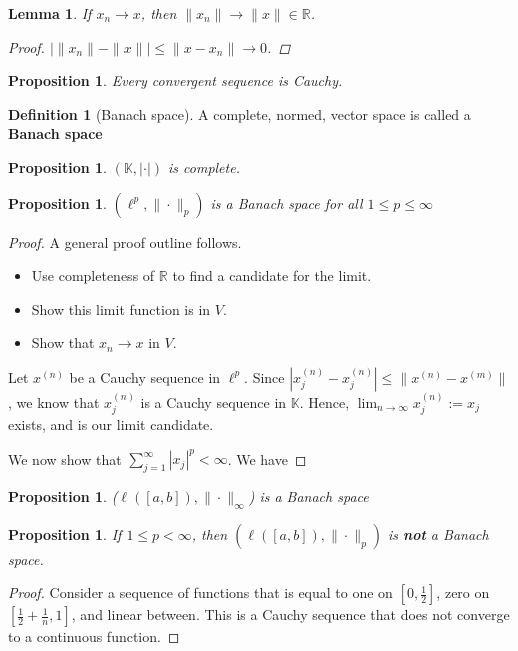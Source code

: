 \documentclass[10pt, reqno, oneside]{amsart}
\theoremstyle{plain}%
\newtheorem{lem}[thm]{Lemma}
\newtheorem{prop}[thm]{Proposition}
\theoremstyle{definition}
\newtheorem{defn}[thm]{Definition}
\theoremstyle{remark}
\newcommand{\R}{\mathbb{R}}
\newcommand{\K}{\mathbb{K}}
\begin{document}
\begin{lem}
	If $x_n \rightarrow x$, then $\| x_n \| \rightarrow \| x \| \in \R$.
	\begin{proof}
		$\left| \| x_n \| - \| x \| \right| \leq \| x - x_n \| \rightarrow 0$.
	\end{proof}
\end{lem}

\begin{prop}
	Every convergent sequence is Cauchy.
\end{prop}

\begin{defn}[Banach space]
A complete, normed, vector space is called a \textbf{Banach space}
\end{defn}

\begin{prop}
	$( \K, |\cdot |)$ is complete.
\end{prop}

\begin{prop}
	$(\ell^p, \| \cdot \|_p)$ is a Banach space for all $1 \leq p \leq \infty$
\end{prop}

\begin{proof}
	A general proof outline follows.
	\begin{itemize}
		\item Use completeness of $\R$ to find a candidate for the limit.
		\item Show this limit function is in $V$.
		\item Show that $x_n \rightarrow x$ in $V$.
 	\end{itemize}
	Let $x^{(n)}$ be a Cauchy sequence in $\ell^p$.  Since $|x_j^{(n)} - x_{j}^{(n)}| \leq \|x^{(n)} - x^{(m)}\|$, we know that $x^{(n)}_j$ is a Cauchy sequence in $\K$.  Hence, $\lim_{n \rightarrow \infty} x^{(n)}_j := x_j$ exists, and is our limit candidate.
	
	We now show that $\sum_{j =1}^\infty |x_j|^p < \infty$.  We have 
\end{proof}

\begin{prop}
	($\ell([a,b]), \|\cdot \|_\infty$) is a Banach space
\end{prop}

\begin{prop}
	If $1 \leq p < \infty$, then $(\ell([a,b]), \| \cdot \|_p)$ is \textbf{not} a Banach space.
\end{prop}
\begin{proof}
	Consider a sequence of functions that is equal to one on $[0, \frac{1}{2}]$, zero on $[\frac{1}{2}+ \frac{1}{n}, 1]$, and linear between.  This is a Cauchy sequence that does not converge to a continuous function. 
\end{proof}
\end{document}
